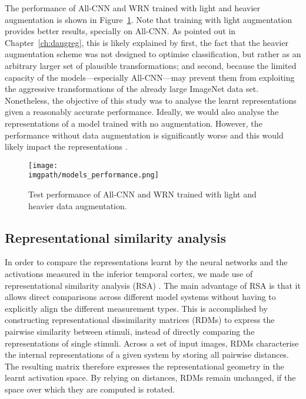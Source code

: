{The performance of All-CNN and WRN trained with light and heavier augmentation is shown in Figure~\ref{fig:daugit-performance}. Note that training with light augmentation provides better results, specially on All-CNN. As pointed out in Chapter~\ref{ch:daugreg}, this is likely explained by first, the fact that the heavier augmentation scheme was not designed to optimise classification, but rather as an arbitrary larger set of plausible transformations; and second, because the limited capacity of the models---especially All-CNN---may prevent them from exploiting the aggressive transformations of the already large ImageNet data set. Nonetheless, the objective of this study was to analyse the learnt representations given a reasonably accurate performance. Ideally, we would also analyse the representations of a model trained with no augmentation. However, the performance without data augmentation is significantly worse and this would likely impact the representations \citep{yamins2014annsbrains}.

\begin{figure}[ht]
  \begin{center}
    \texttt{[image: \\imgpath/models\_performance.png]}
  \end{center}
  \caption{Test performance of All-CNN and WRN trained with light and heavier data augmentation.}
  \label{fig:daugit-performance}
\end{figure}

\subsection{Representational similarity analysis}
In order to compare the representations learnt by the neural networks and the activations measured in the inferior temporal cortex, we made use of representational similarity analysis (RSA) \citep{kriegeskorte2008rsa, nili2014rsatoolbox}. The main advantage of RSA is that it allows direct comparisons across different model systems without having to explicitly align the different measurement types. This is accomplished by constructing representational dissimilarity matrices (RDMs) to express the pairwise similarity between stimuli, instead of directly comparing the representations of single stimuli. Across a set of input images, RDMs characterise the internal representations of a given system by storing all pairwise distances. The resulting matrix therefore expresses the representational geometry in the learnt activation space. By relying on distances, RDMs remain unchanged, if the space over which they are computed is rotated.

}
